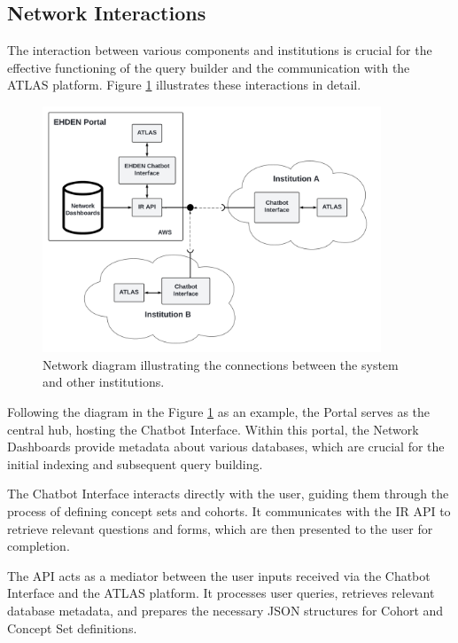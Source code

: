 \subsection{Network Interactions}

The interaction between various components and institutions is crucial for the effective functioning of the query builder and the communication with the ATLAS platform. Figure \ref{fig_network} illustrates these interactions in detail.

\begin{figure}[H]
  \includegraphics[width=0.9\textwidth]{figs/chapter4/network_diagram.png}
  \centering
  \caption{Network diagram illustrating the connections between the system and other institutions.}
  \label{fig_network}
\end{figure}

Following the diagram in the Figure \ref{fig_network} as an example, the {\ehden} Portal serves as the central hub, hosting the {\ehden} Chatbot Interface. Within this portal, the Network Dashboards provide metadata about various databases, which are crucial for the initial indexing and subsequent query building.

The {\ehden} Chatbot Interface interacts directly with the user, guiding them through the process of defining concept sets and cohorts. It communicates with the IR API to retrieve relevant questions and forms, which are then presented to the user for completion.

The {\ir} API acts as a mediator between the user inputs received via the Chatbot Interface and the ATLAS platform. It processes user queries, retrieves relevant database metadata, and prepares the necessary JSON structures for Cohort and Concept Set definitions.

